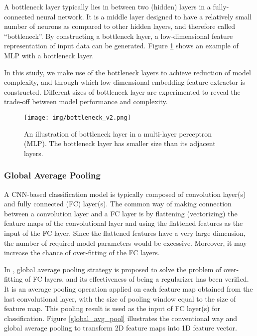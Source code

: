 \documentclass{article}
\begin{document}
A bottleneck layer typically lies in between two (hidden) layers in a fully-connected neural network. It is a middle layer designed to have a relatively small number of neurons as compared to other hidden layers, and therefore called ``bottleneck''. By constructing a bottleneck layer, a low-dimensional feature representation of input data can be generated. Figure \ref{illbneck} shows an example of MLP with a bottleneck layer.

In this study, we make use of the bottleneck layers to achieve reduction of model complexity, and through which low-dimensional embedding feature extractor is constructed. Different sizes of bottleneck layer are experimented to reveal the trade-off between model performance and complexity.

\begin{figure}[h]
  \centering
  \texttt{[image: img/bottleneck\_v2.png]}
  \caption{An illustration of bottleneck layer in a multi-layer perceptron (MLP). The bottleneck layer has smaller size than its adjacent layers.}
  \label{illbneck}
\end{figure}

\subsubsection{Global Average Pooling}
\label{sssec:gloablavgpooling}

A CNN-based classification model is typically composed of convolution layer(s) and fully connected (FC) layer(s). The common way of making connection between a convolution layer and a FC layer is by flattening (vectorizing) the feature maps of the convolutional layer and using the flattened features as the input of the FC layer. Since the flattened features have a very large dimension, the number of required model parameters would be excessive. Moreover, it may increase the chance of over-fitting of the FC layers.


In \cite{netinnet}, global average pooling strategy is proposed to solve the problem of over-fitting of FC layers, and its effectiveness of being a regularizer has been verified. It is an average pooling operation applied on each feature map obtained from the last convolutional layer, with the size of pooling window equal to the size of feature map. This pooling result is used as the input of FC layer(s) for classification. Figure \ref{global_avg_pool} illustrates the conventional way and global average pooling to transform 2D feature maps into 1D feature vector.
\end{document}
